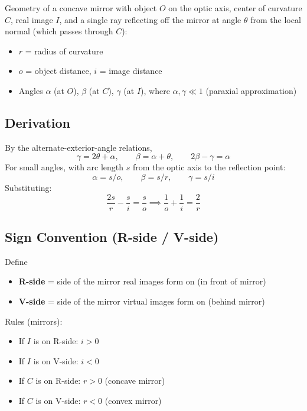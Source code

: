 \documentclass[11pt]{report}
\begin{document}
Geometry of a concave mirror with object $O$ on the optic axis, center of curvature $C$, real image $I$, and a single ray reflecting off the mirror at angle $\theta$ from the local normal (which passes through $C$):
\begin{itemize}
    \item $r$ = radius of curvature
    \item $o$ = object distance, $i$ = image distance
    \item Angles $\alpha$ (at $O$), $\beta$ (at $C$), $\gamma$ (at $I$), where $\alpha, \gamma \ll 1$ (paraxial approximation)
\end{itemize}

\subsection*{Derivation}

By the alternate-exterior-angle relations,
\begin{equation}
\gamma = 2\theta + \alpha, \qquad \beta = \alpha + \theta, \qquad 2\beta - \gamma = \alpha
\end{equation}
For small angles, with arc length $s$ from the optic axis to the reflection point:
\begin{equation}
\alpha = s/o, \qquad \beta = s/r, \qquad \gamma = s/i
\end{equation}
Substituting:
\begin{equation}
\frac{2s}{r} - \frac{s}{i} = \frac{s}{o} \implies \boxed{\frac{1}{o} + \frac{1}{i} = \frac{2}{r}}
\end{equation}

\subsection*{Sign Convention (R-side / V-side)}

Define
\begin{itemize}
    \item \textbf{R-side} = side of the mirror real images form on (in front of mirror)
    \item \textbf{V-side} = side of the mirror virtual images form on (behind mirror)
\end{itemize}

Rules (mirrors):
\begin{itemize}
    \item If $I$ is on R-side: $i > 0$
    \item If $I$ is on V-side: $i < 0$
    \item If $C$ is on R-side: $r > 0$ (concave mirror)
    \item If $C$ is on V-side: $r < 0$ (convex mirror)
\end{itemize}
\end{document}

